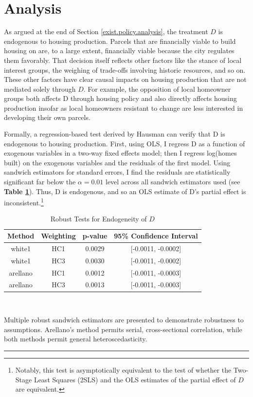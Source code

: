 \documentclass[a4paper,12pt]{article}
\begin{document}
\section{Analysis}
\label{analysis.sec}
As argued at the end of Section \ref{exist.policy.analysis}, the treatment $D$ is endogenous to housing production. Parcels that are financially viable to build housing on are, to a large extent, financially viable because the city regulates them favorably.\cite{monkkonen2016understanding} That decision itself reflects other factors like the stance of local interest groups, the weighing of trade-offs involving historic resources, and so on.\cite{dougherty2020golden} These other factors have clear causal impacts on housing production that are not mediated solely through $D$. For example, the opposition of local homeowner groups both affects D through housing policy and also directly affects housing production insofar as local homeowners resistant to change are less interested in developing their own parcels.

Formally, a regression-based test derived by Hausman can verify that D is endogenous to housing production.\cite{wooldridge2010econometric} First, using OLS, I regress D as a function of exogenous variables in a two-way fixed effects model; then I regress log(homes built) on the exogenous variables and the residuals of the first model. Using sandwich estimators for standard errors, I find the residuals are statistically significant far below the $\alpha=0.01$ level across all sandwich estimators used (see \textbf{Table \ref{hausman.endog.test}}). Thus, D is endogenous, and so an OLS estimate of D's partial effect is inconsistent.\footnote{Notably, this test is asymptotically equivalent to the test of whether the Two-Stage Least Squares (2SLS) and the OLS estimates of the partial effect of $D$ are equivalent.\cite{wooldridge2010econometric}}
\setlength{\tabcolsep}{10pt} 

\begin{table}[bth]
    \centering
    \caption{Robust Tests for Endogeneity of $D$}
    \begin{tabular}{|c|c|c|c|}\\
        \hline
        Method & Weighting & p-value & 95\% Confidence Interval \\
        \hline
        white1 & HC1 & 0.0029 & [-0.0011, -0.0002] \\
        white1 & HC3 & 0.0030 & [-0.0011, -0.0002] \\
        arellano & HC1 & 0.0012 & [-0.0011, -0.0003] \\
        arellano & HC3 & 0.0013 & [-0.0011, -0.0003] \\
        \hline
    \end{tabular}
    \label{hausman.endog.test} \\
    \raggedright
    \medskip
    \small{Multiple robust sandwich estimators are presented to demonstrate robustness to assumptions. Arellano's method permits serial, cross-sectional correlation, while both methods permit general heteroscedasticity.}
    \rule{\linewidth}{0.5pt}
\end{table}
\end{document}
